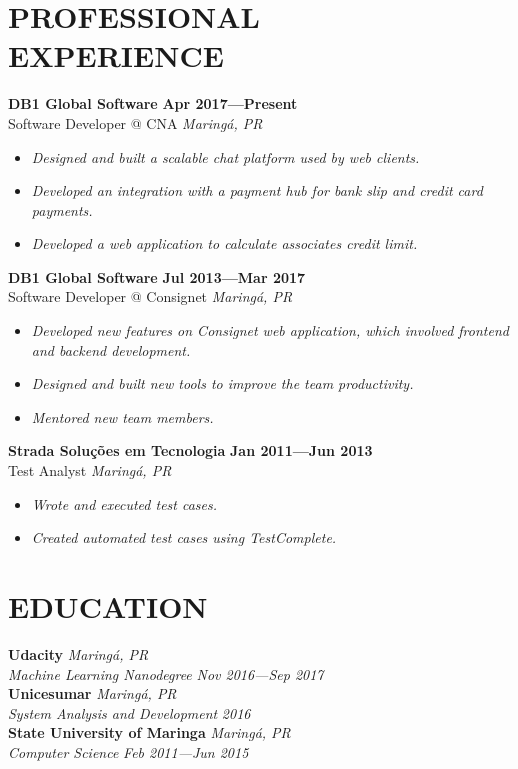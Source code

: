 \documentclass[line,margin]{res}
\begin{document}


\address{\sl marcosatanaka.com --- marcosatanaka@gmail.com --- (44) xxxxx - xxxx}


\begin{resume}


\section{PROFESSIONAL \\ EXPERIENCE}
  {\bf DB1 Global Software} \hfill {\bf Apr 2017---Present} \\
  Software Developer @ CNA \hfill {\sl Maring\'a, PR}\\[-6pt]
  \begin{itemize}
    \item {\sl Designed and built a scalable chat platform used by web clients.}
    \item {\sl Developed an integration with a payment hub for
               bank slip and credit card payments.}
    \item {\sl Developed a web application to calculate associates credit limit.}
  \end{itemize}

  {\bf DB1 Global Software} \hfill {\bf Jul 2013---Mar 2017} \\
  Software Developer @ Consignet \hfill {\sl Maring\'a, PR}\\[-6pt]
  \begin{itemize}
    \item {\sl Developed new features on Consignet web application, which involved
               frontend and backend development.}
    \item {\sl Designed and built new tools to improve the team productivity.}
    \item {\sl Mentored new team members.}
  \end{itemize}

  {\bf Strada Solu\c{c}\~oes em Tecnologia} \hfill {\bf Jan 2011---Jun 2013} \\
  Test Analyst \hfill {\sl Maring\'a, PR}\\[-6pt]
    \begin{itemize}
    \item {\sl Wrote and executed test cases.}
    \item {\sl Created automated test cases using TestComplete.}
  \end{itemize}


\section{EDUCATION}
  {\bf Udacity} \hfill {\sl Maring\'a, PR} \\
  {\sl Machine Learning Nanodegree} \hfill {\sl Nov 2016---Sep 2017}\\[6pt]
  {\bf Unicesumar} \hfill {\sl Maring\'a, PR} \\
  {\sl System Analysis and Development} \hfill {\sl 2016}\\[6pt]
  {\bf State University of Maringa} \hfill {\sl Maring\'a, PR} \\
  {\sl Computer Science} \hfill {\sl Feb 2011---Jun 2015}



\end{resume}
\end{document}
